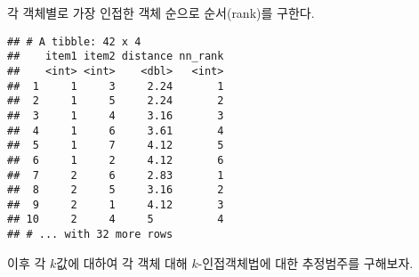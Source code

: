 \documentclass[]{book}
\newenvironment{Shaded}{\begin{snugshade}}{\end{snugshade}}
\newcommand{\DataTypeTok}[1]{\textcolor[rgb]{0.13,0.29,0.53}{#1}}
\newcommand{\KeywordTok}[1]{\textcolor[rgb]{0.13,0.29,0.53}{\textbf{#1}}}
\newcommand{\NormalTok}[1]{#1}
\newcommand{\OperatorTok}[1]{\textcolor[rgb]{0.81,0.36,0.00}{\textbf{#1}}}
\newcommand{\StringTok}[1]{\textcolor[rgb]{0.31,0.60,0.02}{#1}}
\begin{document}
각 객체별로 가장 인접한 객체 순으로 순서(rank)를 구한다.

\begin{Shaded}
\end{Shaded}

\begin{verbatim}
## # A tibble: 42 x 4
##    item1 item2 distance nn_rank
##    <int> <int>    <dbl>   <int>
##  1     1     3     2.24       1
##  2     1     5     2.24       2
##  3     1     4     3.16       3
##  4     1     6     3.61       4
##  5     1     7     4.12       5
##  6     1     2     4.12       6
##  7     2     6     2.83       1
##  8     2     5     3.16       2
##  9     2     1     4.12       3
## 10     2     4     5          4
## # ... with 32 more rows
\end{verbatim}

이후 각 \(k\)값에 대하여 각 객체 대해 \(k\)-인접객체법에 대한 추정범주를 구해보자.
\end{document}
